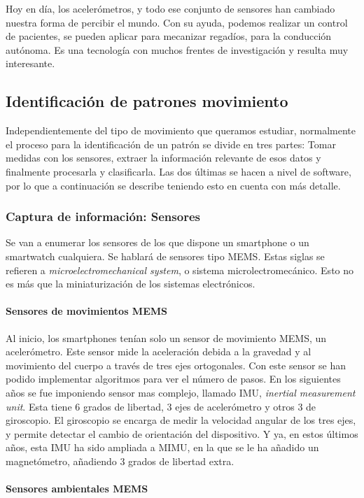 \documentclass[12pt]{article}
\numberwithin{equation}{section}
\begin{document}
Hoy en día, los acelerómetros, y todo ese conjunto de sensores han cambiado nuestra forma de percibir el mundo. Con su ayuda, podemos realizar un control de pacientes, se pueden aplicar para mecanizar regadíos, para la conducción autónoma. Es una tecnología con muchos frentes de investigación y resulta muy interesante.

\subsection{Identificación de patrones movimiento}
Independientemente del tipo de movimiento que queramos estudiar, normalmente el proceso para la identificación de un patrón se divide en tres partes: Tomar medidas con los sensores, extraer la información relevante de esos datos y finalmente procesarla y clasificarla. Las dos últimas se hacen a nivel de software, por lo que a continuación se describe teniendo esto en cuenta con más detalle.

\subsubsection{Captura de información: Sensores}
Se van a enumerar los sensores de los que dispone un smartphone o un smartwatch cualquiera. Se hablará de sensores tipo MEMS. Estas siglas se refieren a \textit{microelectromechanical system}, o sistema microlectromecánico. Esto no es más que la miniaturización de los sistemas electrónicos.

\paragraph{Sensores de movimientos MEMS}

Al inicio, los smartphones tenían solo un sensor de movimiento MEMS, un acelerómetro. Este sensor mide la aceleración debida a la gravedad y al movimiento del cuerpo a través de tres ejes ortogonales. Con este sensor se han podido implementar algoritmos para ver el número de pasos. En los siguientes años se fue imponiendo sensor mas complejo, llamado IMU, \textit{inertial measurement unit}. Esta tiene 6 grados de libertad, 3 ejes de acelerómetro y otros 3 de giroscopio. El giroscopio se encarga de medir la velocidad angular de los tres ejes, y permite detectar el cambio de orientación del dispositivo. Y ya, en estos últimos años, esta IMU ha sido ampliada a MIMU, en la que se le ha añadido un magnetómetro, añadiendo 3 grados de libertad extra.

\paragraph{Sensores ambientales MEMS}
\end{document}
